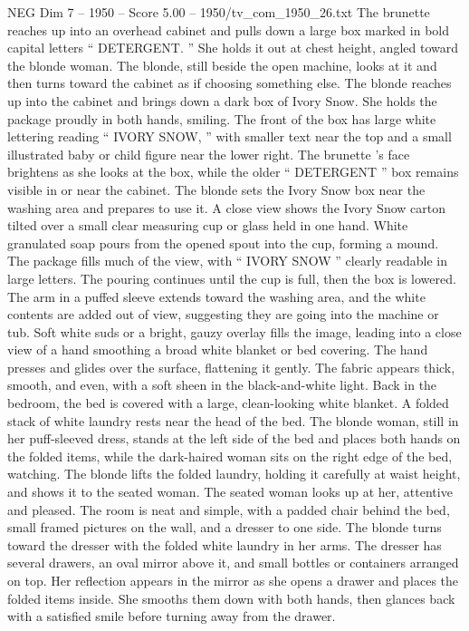 \begin{textsample}{NEG Dim 7 – 1950 – Score 5.00 – 1950/tv\_com\_1950\_26.txt}
The brunette reaches up into an overhead cabinet and pulls down a large box marked in bold capital letters “ DETERGENT. ” She holds it out at chest height, angled toward the blonde woman.
The blonde, still beside the open machine, looks at it and then turns toward the cabinet as if choosing something else.
The blonde reaches up into the cabinet and brings down a dark box of Ivory Snow.
She holds the package proudly in both hands, smiling.
The front of the box has large white lettering reading “ IVORY SNOW, ” with smaller text near the top and a small illustrated baby or child figure near the lower right.
The brunette ’s face brightens as she looks at the box, while the older “ DETERGENT ” box remains visible in or near the cabinet.
The blonde sets the Ivory Snow box near the washing area and prepares to use it.
A close view shows the Ivory Snow carton tilted over a small clear measuring cup or glass held in one hand.
White granulated soap pours from the opened spout into the cup, forming a mound.
The package fills much of the view, with “ IVORY SNOW ” clearly readable in large letters.
The pouring continues until the cup is full, then the box is lowered.
The arm in a puffed sleeve extends toward the washing area, and the white contents are added out of view, suggesting they are going into the machine or tub.
Soft white suds or a bright, gauzy overlay fills the image, leading into a close view of a hand smoothing a broad white blanket or bed covering.
The hand presses and glides over the surface, flattening it gently.
The fabric appears thick, smooth, and even, with a soft sheen in the black-and-white light.
Back in the bedroom, the bed is covered with a large, clean-looking white blanket.
A folded stack of white laundry rests near the head of the bed.
The blonde woman, still in her puff-sleeved dress, stands at the left side of the bed and places both hands on the folded items, while the dark-haired woman sits on the right edge of the bed, watching.
The blonde lifts the folded laundry, holding it carefully at waist height, and shows it to the seated woman.
The seated woman looks up at her, attentive and pleased.
The room is neat and simple, with a padded chair behind the bed, small framed pictures on the wall, and a dresser to one side.
The blonde turns toward the dresser with the folded white laundry in her arms.
The dresser has several drawers, an oval mirror above it, and small bottles or containers arranged on top.
Her reflection appears in the mirror as she opens a drawer and places the folded items inside.
She smooths them down with both hands, then glances back with a satisfied smile before turning away from the drawer.

\end{textsample}
